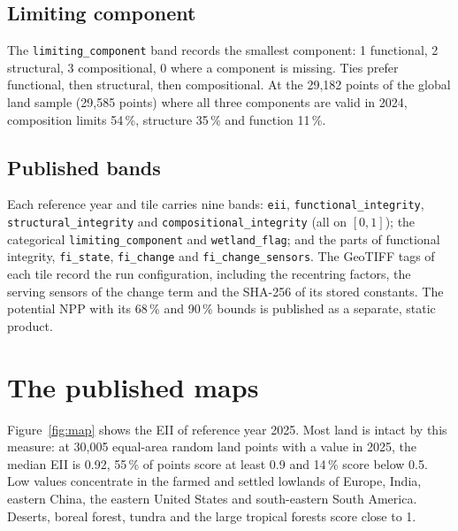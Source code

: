 \documentclass[11pt,a4paper]{article}
\begin{document}
\subsection{Limiting component}

The \texttt{limiting\_component} band records the smallest component: 1 functional,
2 structural, 3 compositional, 0 where a component is missing. Ties prefer functional, then
structural, then compositional. At the 29,182 points of the global land sample (29,585 points)
where all three components are valid in 2024,
composition limits 54\,\%, structure 35\,\% and function 11\,\%.

\subsection{Published bands}

\begin{sloppypar}
Each reference year and tile carries nine bands: \texttt{eii},
\texttt{functional\_integrity}, \texttt{structural\_integrity} and
\texttt{compositional\_integrity} (all on $[0,1]$); the categorical \texttt{limiting\_component}
and \texttt{wetland\_flag}; and the parts of functional integrity, \texttt{fi\_state},
\texttt{fi\_change} and \texttt{fi\_change\_sensors}. The GeoTIFF tags of each tile record the run
configuration, including the recentring factors, the serving sensors of the change term and the
SHA-256 of its stored constants. The potential NPP with its 68\,\% and 90\,\% bounds is published
as a separate, static product.
\end{sloppypar}

\section{The published maps}
\label{sec:results}

Figure~\ref{fig:map} shows the EII of reference year 2025. Most land is intact by this measure:
at 30,005 equal-area random land points with a value in 2025, the median EII is 0.92, 55\,\% of
points score at least 0.9 and 14\,\% score below 0.5. Low values concentrate in the farmed and
settled lowlands of Europe, India, eastern China, the eastern United States and south-eastern
South America. Deserts, boreal forest, tundra and the large tropical forests score close
to 1.
\end{document}
